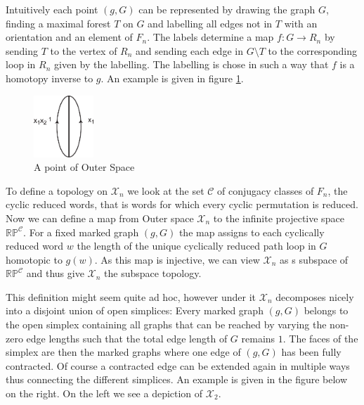 Intuitively each point $(g,G)$ can be represented by drawing the graph $G$,
finding a maximal forest $T$ on $G$ and labelling all edges not in $T$ with an orientation
and an element of $F_{n}$.
The labels determine a map $f: G \to R_{n}$ by sending $T$ to the vertex of $R_{n}$ and sending
each edge in $G \setminus T$ to the corresponding loop in $R_{n}$ given by the labelling.
The labelling is chose in such a way that $f$ is a homotopy inverse to $g$.
An example is given in figure \ref{fig:pointOfXn}.
\begin{figure}[h]
	\label{fig:pointOfXn}
	\centering
	\includegraphics[width=0.2\textwidth]{./Images/pointOfOuterSpace.pdf}
	\caption{A point of Outer Space}
\end{figure}

To define a topology on $\mathcal{X}_{n}$ we look at the set $\mathcal{C}$ of conjugacy classes of $F_{n}$, the cyclic reduced words,
that is words for which every cyclic permutation is reduced.
Now we can define a map from Outer space $\mathcal{X}_{n}$ to the infinite projective space $\mathbb{RP}^{\mathcal{C}}$.
For a fixed marked graph $(g,G)$ the map assigns to each cyclically reduced word $w$ the length
of the unique cyclically reduced path loop in $G$ homotopic to $g(w)$.
As this map is injective, we can view $\mathcal{X}_{n}$ as s subspace of $\mathbb{RP}^{\mathcal{C}}$ and thus
give $\mathcal{X}_{n}$ the subspace topology.

This definition might seem quite ad hoc, however under it $\mathcal{X}_{n}$ decomposes nicely into
a disjoint union of open simplices: Every marked graph $(g,G)$ belongs to the open simplex
containing all graphs that can be reached by varying the non-zero edge lengths such that
the total edge length of $G$ remains $1$. The faces of the simplex are then the marked graphs where one edge of $(g,G)$
has been fully contracted. Of course a contracted edge can be extended again in multiple ways thus connecting
the different simplices. An example is given in the figure below on the right.
On the left we see a depiction of $\mathcal{X}_{2}$.


